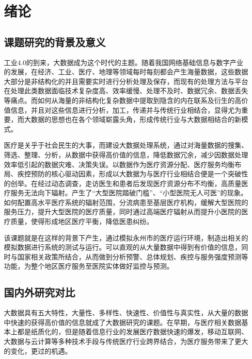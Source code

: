 \documentclass{husethesis}
\begin{document}
\section{绪论}                     %

\subsection{课题研究的背景及意义}  %
工业4.0的到来，大数据成为这个时代的主题。随着我国网络基础信息与数字产业的发展，在经济、工业、医疗、地理等领域每时每刻都会产生海量数据，这些数据大部分是非结构化的并且需要实时进行分析处理及保存，而现有的处理方法与平台在处理此类数据面临技术复杂度高、效率缓慢、处理不及时、数据冗余、数据丢失等痛点。而如何从海量的非结构化复杂数据中提取到隐含的内在联系及衍生的高价值信息，并且对这些信息进行分析，加工，传递并与传统行业相结合，显得尤为重要，而大数据的思想也在各个领域崭露头角，形成传统行业与大数据相结合的新模式。

医疗是关乎于社会民生的大事，而建设大数据处理系统，通过对海量数据的搜集、筛选、整理、分析，从数据中获得高价值的信息，降低数据冗余，减少因数据处理效率低引起的数据灾难、决策失误。以数据作为医疗资源分配、医疗服务均衡布局、疾控预防的核心驱动因素，形成以大数据为与医疗行业相结合便是一个突破性的创举。在经过动态调查，走访医生和患者后发现医疗资源分布不均衡，高质量医疗服务无法向下辐射。产生了“大型医院踏破门槛”、“小型医院无人可医”的现象。如何配置高水平医疗系统的辐射范围，分流病患至基层医疗机构，缓解大型医院的服务压力，提升大型医院的医疗质量，同时通过高端医疗辐射从而提升小医院的医疗质量，使得形成地区医疗平衡，降低医患纠纷。

该课题就是在这样的背景下产生，通过模拟永州市的医疗运行环境，制造出相关的模拟数据进行系统的测试与运行。可以直观的从大量数据中得到有价值的信息，同时与国家相关政策所结合，从而做到分析预警、总体规划、疾控与服务强度预测等功能，为整个地区医疗服务至医院实体做好监控与预测。

\subsection{国内外研究对比}
\setlength{\parindent}{21pt}
大数据具有五大特性，大量性、多样性、快速性、价值性与真实性，从大量的数据中快速的获得高价值的信息就成了大数据研究的课题。在早期，与医疗相关数据基本上都是纸质化的，但是随着信息行业的发展医疗数据快速的爆发，移动互联网、大数据与云计算等多种技术手段与传统医疗行业跨界结合，为医疗服务带来了更大的变化，更过的机遇。
\end{document}
